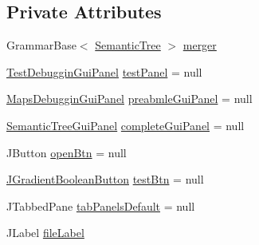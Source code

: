 \subsection*{Private Attributes}
\begin{DoxyCompactItemize}
\item 
Grammar\-Base$<$ \hyperlink{classit_1_1emarolab_1_1cagg_1_1core_1_1evaluation_1_1semanticGrammar_1_1SemanticTree}{Semantic\-Tree} $>$ \hyperlink{classit_1_1emarolab_1_1cagg_1_1debugging_1_1DebuggingGui_a03d18ffb6d8ab6c84ad429c8dac4b886}{merger}
\item 
\hyperlink{classit_1_1emarolab_1_1cagg_1_1debugging_1_1baseComponents_1_1customPanel_1_1TestDebugginGuiPanel}{Test\-Debuggin\-Gui\-Panel} \hyperlink{classit_1_1emarolab_1_1cagg_1_1debugging_1_1DebuggingGui_a6c46d4da282f798650a68c5f638123ce}{test\-Panel} = null
\item 
\hyperlink{classit_1_1emarolab_1_1cagg_1_1debugging_1_1baseComponents_1_1customPanel_1_1MapsDebugginGuiPanel}{Maps\-Debuggin\-Gui\-Panel} \hyperlink{classit_1_1emarolab_1_1cagg_1_1debugging_1_1DebuggingGui_ac536389243b0b3ca1a49d40346cf5ede}{preabmle\-Gui\-Panel} = null
\item 
\hyperlink{classit_1_1emarolab_1_1cagg_1_1debugging_1_1baseComponents_1_1customPanel_1_1SemanticTreeGuiPanel}{Semantic\-Tree\-Gui\-Panel} \hyperlink{classit_1_1emarolab_1_1cagg_1_1debugging_1_1DebuggingGui_afb478af04b658db9dcb70d49150e8c08}{complete\-Gui\-Panel} = null
\item 
J\-Button \hyperlink{classit_1_1emarolab_1_1cagg_1_1debugging_1_1DebuggingGui_a41c02534a8378f4c96b9a7135586ea63}{open\-Btn} = null
\item 
\hyperlink{classit_1_1emarolab_1_1cagg_1_1debugging_1_1baseComponents_1_1JGradientBooleanButton}{J\-Gradient\-Boolean\-Button} \hyperlink{classit_1_1emarolab_1_1cagg_1_1debugging_1_1DebuggingGui_acd9b707d85f9d3ea144eb76dd29b85e8}{test\-Btn} = null
\item 
J\-Tabbed\-Pane \hyperlink{classit_1_1emarolab_1_1cagg_1_1debugging_1_1DebuggingGui_abc4c379696724458228ca44c7c71205e}{tab\-Panels\-Default} = null
\item 
J\-Label \hyperlink{classit_1_1emarolab_1_1cagg_1_1debugging_1_1DebuggingGui_a423e74c9f3b4fc31b910bcc9f1c172d0}{file\-Label}
\end{DoxyCompactItemize}
